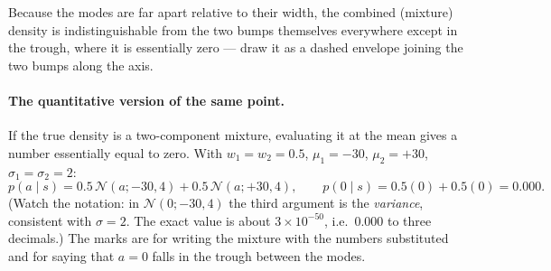 \documentclass[11pt,a4paper]{article}
\begin{document}
\begin{center}
\end{center}

\noindent Because the modes are far apart relative to their width, the
combined (mixture) density is indistinguishable from the two bumps
themselves everywhere except in the trough, where it is essentially zero ---
draw it as a dashed envelope joining the two bumps along the axis.

\paragraph{The quantitative version of the same point.} If the true density
is a two-component mixture, evaluating it at the mean gives a number
essentially equal to zero. With $w_1=w_2=0.5$, $\mu_1=-30$, $\mu_2=+30$,
$\sigma_1=\sigma_2=2$:
\[
p(a\mid s)=0.5\,\mathcal N(a;-30,4)+0.5\,\mathcal N(a;+30,4),
\qquad
p(0\mid s)=0.5(0)+0.5(0)=\mathbf{0.000}.
\]
(Watch the notation: in $\mathcal N(0;-30,4)$ the third argument is the
\emph{variance}, consistent with $\sigma=2$. The exact value is about
$3\times10^{-50}$, i.e.\ $0.000$ to three decimals.) The marks are for
writing the mixture with the numbers substituted and for saying that $a=0$
falls in the trough between the modes.
\end{document}
